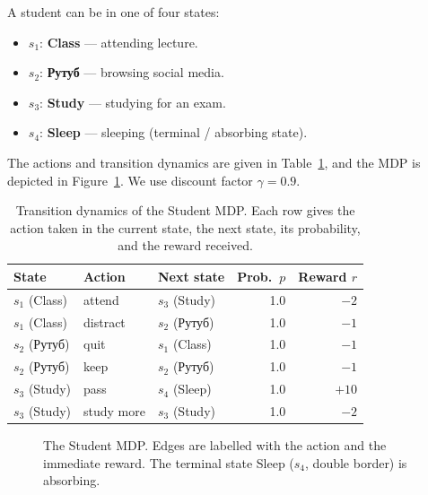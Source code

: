 \begin{example}
\label{ex:student-mdp}
A student can be in one of four states:
\begin{itemize}[leftmargin=*]
  \item $s_1$: \textbf{Class} --- attending lecture.
  \item $s_2$: \textbf{Рутуб} --- browsing social media.
  \item $s_3$: \textbf{Study} --- studying for an exam.
  \item $s_4$: \textbf{Sleep} --- sleeping (terminal / absorbing state).
\end{itemize}
The actions and transition dynamics are given in Table~\ref{tab:student-mdp}, and the MDP is depicted in Figure~\ref{fig:student-mdp}. We use discount factor $\gamma = 0.9$.

\begin{table}[ht]
\centering
\caption{Transition dynamics of the Student MDP. Each row gives the action taken in the current state, the next state, its probability, and the reward received.}
\label{tab:student-mdp}
\begin{tabular}{lllrr}
\toprule
State & Action & Next state & Prob.\ $p$ & Reward $r$ \\
\midrule
$s_1$ (Class) & attend & $s_3$ (Study) & 1.0 & $-2$ \\
$s_1$ (Class) & distract & $s_2$ (Рутуб) & 1.0 & $-1$ \\
$s_2$ (Рутуб) & quit & $s_1$ (Class) & 1.0 & $-1$ \\
$s_2$ (Рутуб) & keep & $s_2$ (Рутуб) & 1.0 & $-1$ \\
$s_3$ (Study) & pass & $s_4$ (Sleep) & 1.0 & $+10$ \\
$s_3$ (Study) & study more & $s_3$ (Study) & 1.0 & $-2$ \\
\bottomrule
\end{tabular}
\end{table}

\begin{figure}[ht]
\centering
{}
\caption{The Student MDP. Edges are labelled with the action and the immediate reward. The terminal state Sleep ($s_4$, double border) is absorbing.}
\label{fig:student-mdp}
\end{figure}


\end{example}
